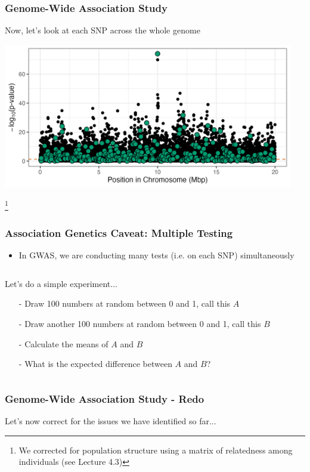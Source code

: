 \documentclass[xcolor=dvipsnames]{beamer}
\newcommand\blfootnote[1]{%
	\begingroup
	\renewcommand\thefootnote{}\footnote{#1}%
	\addtocounter{footnote}{-1}%
	\endgroup
}
\begin{document}
\begin{frame}
	\frametitle{Genome-Wide Association Study}
	Now, let's look at each SNP across the whole genome 
	
	\includegraphics[keepaspectratio, width  = 0.95\textwidth]{img/uncorPlot_DataHlineTrue}				
	
	\blfootnote{We corrected for population structure using a matrix of relatedness among individuals (see Lecture 4.3)}
\end{frame}


\begin{frame}	
	\frametitle{Association Genetics Caveat: Multiple Testing}
\begin{itemize}	
\item In GWAS, we are conducting many tests (i.e. on each SNP) simultaneously
\end{itemize} \pause


\begin{columns}
	\begin{column}{0.5\textwidth}
		Let's do a simple experiment...\\
		\begin{itemize}
			\item[-] Draw 100 numbers at random between 0 and 1, call this $A$ \pause
			\item[-] Draw another 100 numbers at random between 0 and 1, call this $B$ \pause
			\item[-] Calculate the means of $A$ and $B$ \pause
			\item[-] What is the expected difference between $A$ and $B$? \pause
			\end{itemize}
		
		
	\end{column}
	\begin{column}{0.5\textwidth}
	\end{column}
\end{columns}





\end{frame}

\begin{frame}
		\frametitle{Genome-Wide Association Study - Redo}

Let's now correct for the issues we have identified so far...

\end{frame}
\end{document}
